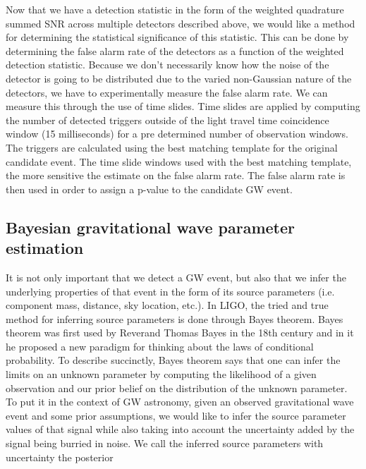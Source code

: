 %
Now that we have a detection statistic in the form of the weighted quadrature summed \ac{SNR} across multiple detectors described above, we would like a method for determining the statistical significance of this statistic. This can be done by determining the false alarm rate of the detectors as a function of the weighted detection statistic. Because we don't necessarily know how the noise of the detector is going to be distributed due to the varied non-Gaussian nature of the detectors, we have to experimentally measure the false alarm rate. We can measure this through the use of time slides. Time slides are applied by computing the number of detected triggers outside of the light travel time coincidence window (15 milliseconds) for a pre determined number of observation windows. The triggers are calculated using the best matching template for the original candidate event. The time slide windows used with the best matching template, the more sensitive the estimate on the false alarm rate. The false alarm rate is then used in order to assign a p-value to the candidate \ac{GW} event.

\subsection{Bayesian gravitational wave parameter estimation}

%
%

%
%
It is not only important that we detect a \ac{GW} event, but also that we infer the underlying properties of that event in the form of its source parameters (i.e. component mass, distance, sky location, etc.). In \ac{LIGO}, the tried and true method for inferring source parameters is done through Bayes theorem. Bayes theorem was first used by Reverand Thomas Bayes in the 18th century and in it he proposed a new paradigm for thinking about the laws of conditional probability. To describe succinctly, Bayes theorem says that one can infer the limits on an unknown parameter by computing the likelihood of a given observation and our prior belief on the distribution of the unknown parameter. To put it in the context of \ac{GW} astronomy, given an observed gravitational wave event and some prior assumptions, we would like to infer the source parameter values of that signal while also taking into account the uncertainty added by the signal being burried in noise. We call the inferred source parameters with uncertainty the posterior 

